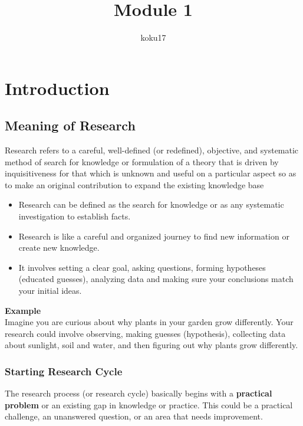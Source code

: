 \documentclass{article}
\author{koku17}
\title{Module 1}
\begin{document}
	 \maketitle \newpage
	  \tableofcontents
	 \listoffigures \newpage

	\section{Introduction}
	\subsection{Meaning of Research}
	Research refers to a careful, well-defined (or redefined), objective, and systematic method of search for
	knowledge or formulation of a theory that is driven by inquisitiveness for that which is unknown and useful
	on a particular aspect so as to make an original contribution to expand the existing knowledge base

	\begin{itemize}
		\item Research can be defined as the search for knowledge or as any systematic investigation to
			establish facts.
		\item Research is like a careful and organized journey to find new information or create new knowledge.
		\item It involves setting a clear goal, asking questions, forming hypotheses (educated guesses),
			analyzing data and making sure your conclusions match your initial ideas.
	\end{itemize}

	\noindent \textbf{Example} \\
	Imagine you are curious about why plants in your garden grow differently. Your research could involve
	observing, making guesses (hypothesis), collecting data about sunlight, soil and water, and then figuring
	out why plants grow differently. \newpage

	\subsubsection{Starting Research Cycle}
	The research process (or research cycle) basically begins with a \textbf{practical problem} or an existing
	gap in knowledge or practice. This could be a practical challenge, an unanswered question, or an area that
	needs improvement.
\end{document}
